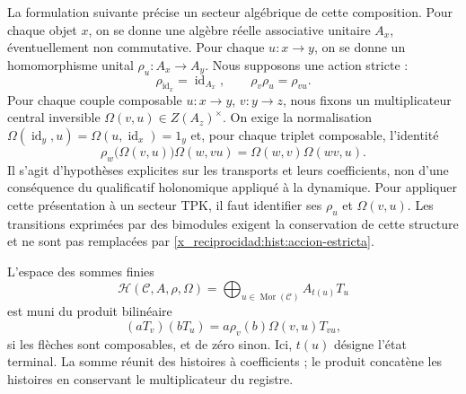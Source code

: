 La formulation suivante précise un secteur algébrique de cette composition.
Pour chaque objet \(x\), on se donne une algèbre réelle associative unitaire \(A_x\),
éventuellement non commutative. Pour chaque \(u:x\to y\), on se donne un
homomorphisme unital \(\rho_u:A_x\to A_y\). Nous supposons une action stricte :
\begin{equation}
 \rho_{\operatorname{id}_x}=\operatorname{id}_{A_x},\qquad
 \rho_v\rho_u=\rho_{vu}.
 \label{x_reciprocidad:hist:accion-estricta}
\end{equation}
Pour chaque couple composable \(u:x\to y\), \(v:y\to z\), nous fixons un
multiplicateur central inversible
\(\Omega(v,u)\in Z(A_z)^\times\). On exige la normalisation
\(\Omega(\operatorname{id}_y,u)=\Omega(u,\operatorname{id}_x)=1_y\)
et, pour chaque triplet composable, l’identité
\begin{equation}
 \rho_w\bigl(\Omega(v,u)\bigr)\Omega(w,vu)
   =\Omega(w,v)\Omega(wv,u).
 \label{x_reciprocidad:hist:cociclo}
\end{equation}
Il s’agit d’hypothèses explicites sur les transports et leurs coefficients, non d’une
conséquence du qualificatif holonomique appliqué à la dynamique. Pour appliquer cette présentation
à un secteur TPK, il faut identifier ses \(\rho_u\) et \(\Omega(v,u)\).
Les transitions exprimées par des bimodules exigent la conservation de cette
structure et ne sont pas remplacées par \eqref{x_reciprocidad:hist:accion-estricta}.

L’espace des sommes finies
\[
 \mathcal H(\mathcal C,A,\rho,\Omega)
   =\bigoplus_{u\in\operatorname{Mor}(\mathcal C)} A_{t(u)}T_u
\]
est muni du produit bilinéaire
\begin{equation}
 (aT_v)(bT_u)=a\rho_v(b)\Omega(v,u)T_{vu},
 \label{x_reciprocidad:hist:producto}
\end{equation}
si les flèches sont composables, et de zéro sinon. Ici, \(t(u)\)
désigne l’état terminal. La somme réunit des histoires à coefficients ; le
produit concatène les histoires en conservant le multiplicateur du registre.

